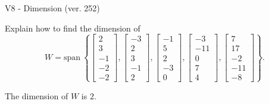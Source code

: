 \begin{exercise}
  \begin{exerciseTitle}V8 - Dimension (ver. 252)\end{exerciseTitle}
  \begin{exerciseStatement}
    Explain how to find the dimension of 
\[W=\mathrm{span}\ \left\{\left[\begin{array}{r}
2 \\
3 \\
-1 \\
-2 \\
-2
\end{array}\right] , \left[\begin{array}{r}
-3 \\
2 \\
3 \\
-1 \\
2
\end{array}\right] , \left[\begin{array}{r}
-1 \\
5 \\
2 \\
-3 \\
0
\end{array}\right] , \left[\begin{array}{r}
-3 \\
-11 \\
0 \\
7 \\
4
\end{array}\right] , \left[\begin{array}{r}
7 \\
17 \\
-2 \\
-11 \\
-8
\end{array}\right]\right\}.\]



  \end{exerciseStatement}
  \begin{exerciseAnswer}
   The dimension of \(W\) is  \(2\).
  


  \end{exerciseAnswer}
\end{exercise}